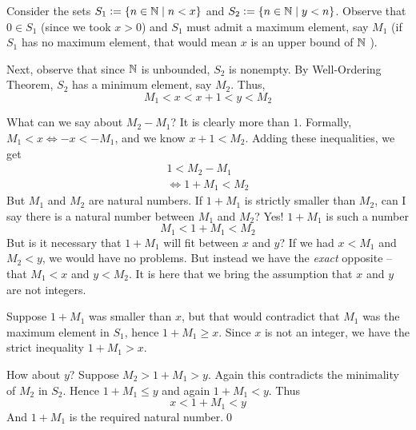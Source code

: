 \begin{smrg}
\pf Consider the sets $S_1 := \{n \in \mathbb{N} \space \mid \space n < x\}$ and $S_2 := \{n \in \mathbb{N} \space \mid \space y < n\}$. Observe that $0 \in S_1$ (since we took $x > 0$) and $S_1$ must admit a maximum element, say $M_1$ (if $S_1$ has no maximum element, that would mean $x$ is an upper bound of $\mathbb{N}$ \contra).

Next, observe that since $\mathbb{N}$ is unbounded, $S_2$ is nonempty. By Well-Ordering Theorem, $S_2$ has a minimum element, say $M_2$. Thus,
$$M_1 < x < x + 1 < y < M_2$$

\begin{center}
\end{center}

What can we say about $M_2 - M_1$? It is clearly more than $1$. Formally, $M_1 < x \iff -x < -M_1$, and we know $x + 1 < M_2$. Adding these inequalities, we get
\begin{align*}
1 < M_2 - M_1\\
\iff 1 + M_1 < M_2
\end{align*}
But $M_1$ and $M_2$ are natural numbers. If $1 + M_1$ is strictly smaller than $M_2$, can I say there is a natural number between $M_1$ and $M_2$? Yes! $1 + M_1$ is such a number
$$
M_1 < 1 + M_1 < M_2
$$
But is it necessary that $1 + M_1$ will fit between $x$ and $y$? If we had $x < M_1$ and $M_2 < y$, we would have no problems. But instead we have the \emph{exact} opposite -- that $M_1 < x$ and $y < M_2$. It is here that we bring the assumption that $x$ and $y$ are not integers.

Suppose $1 + M_1$ was smaller than $x$, but that would contradict that $M_1$ was the maximum element in $S_1$, hence $1 + M_1 \geq x$. Since $x$ is not an integer, we have the strict inequality $1 + M_1 > x$.

How about $y$? Suppose $M_2 > 1 + M_1 > y$. Again this contradicts the minimality of $M_2$ in $S_2$. Hence $1 + M_1 \leq y$ and again $1 + M_1 < y$. Thus $$x < 1 + M_1 < y$$ And $1 + M_1$ is the required natural number.\qed


\end{smrg}

